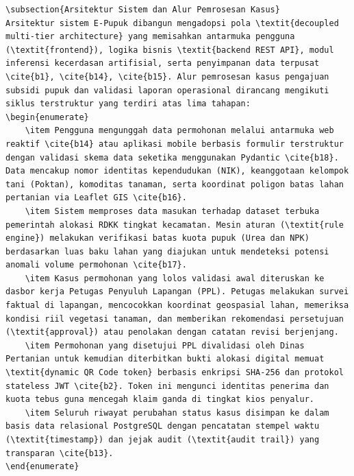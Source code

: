 \documentclass[conference]{IEEEtran}
\begin{document}
\begin{lstlisting}
\subsection{Arsitektur Sistem dan Alur Pemrosesan Kasus}
Arsitektur sistem E-Pupuk dibangun mengadopsi pola \textit{decoupled multi-tier architecture} yang memisahkan antarmuka pengguna (\textit{frontend}), logika bisnis \textit{backend REST API}, modul inferensi kecerdasan artifisial, serta penyimpanan data terpusat \cite{b1}, \cite{b14}, \cite{b15}. Alur pemrosesan kasus pengajuan subsidi pupuk dan validasi laporan operasional dirancang mengikuti siklus terstruktur yang terdiri atas lima tahapan:
\begin{enumerate}
    \item Pengguna mengunggah data permohonan melalui antarmuka web reaktif \cite{b14} atau aplikasi mobile berbasis formulir terstruktur dengan validasi skema data seketika menggunakan Pydantic \cite{b18}. Data mencakup nomor identitas kependudukan (NIK), keanggotaan kelompok tani (Poktan), komoditas tanaman, serta koordinat poligon batas lahan pertanian via Leaflet GIS \cite{b16}.
    \item Sistem memproses data masukan terhadap dataset terbuka pemerintah alokasi RDKK tingkat kecamatan. Mesin aturan (\textit{rule engine}) melakukan verifikasi batas kuota pupuk (Urea dan NPK) berdasarkan luas baku lahan yang diajukan untuk mendeteksi potensi anomali volume permohonan \cite{b17}.
    \item Kasus permohonan yang lolos validasi awal diteruskan ke dasbor kerja Petugas Penyuluh Lapangan (PPL). Petugas melakukan survei faktual di lapangan, mencocokkan koordinat geospasial lahan, memeriksa kondisi riil vegetasi tanaman, dan memberikan rekomendasi persetujuan (\textit{approval}) atau penolakan dengan catatan revisi berjenjang.
    \item Permohonan yang disetujui PPL divalidasi oleh Dinas Pertanian untuk kemudian diterbitkan bukti alokasi digital memuat \textit{dynamic QR Code token} berbasis enkripsi SHA-256 dan protokol stateless JWT \cite{b2}. Token ini mengunci identitas penerima dan kuota tebus guna mencegah klaim ganda di tingkat kios penyalur.
    \item Seluruh riwayat perubahan status kasus disimpan ke dalam basis data relasional PostgreSQL dengan pencatatan stempel waktu (\textit{timestamp}) dan jejak audit (\textit{audit trail}) yang transparan \cite{b13}.
\end{enumerate}


\end{lstlisting}
\end{document}
